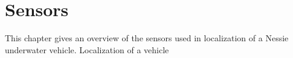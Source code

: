 \chapter{Sensors} \label{chap:sensors}

This chapter gives an overview of the sensors used in localization of a Nessie underwater vehicle. Localization of a vehicle 